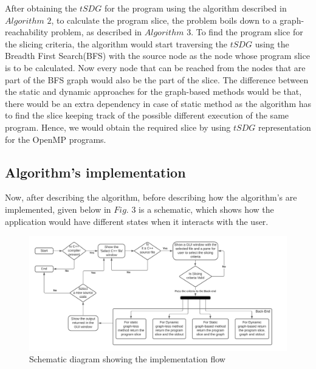 \documentclass[conference]{IEEEtran}
\begin{document}
 After obtaining the $tSDG$ for the program using the algorithm described in $Algorithm$ $2$, to calculate the program slice, the problem boils down to a graph-reachability problem, as described in $Algorithm$ $3$. To find the program slice for the slicing criteria, the algorithm would start traversing the $tSDG$ using the Breadth First Search(BFS) with the source node as the node whose program slice is to be calculated. Now every node that can be reached from the nodes that are part of the BFS graph would also be the part of the slice. The difference between the static and dynamic approaches for the graph-based methods would be that, there would be an extra dependency in case of static method as the algorithm has to find the slice keeping track of the possible different execution of the same program. Hence, we would obtain the required slice by using $tSDG$ representation for the OpenMP programs.   
\subsection{Algorithm's implementation}
Now, after describing the  algorithm, before describing how the algorithm's are implemented, given below in $Fig.$ $3$ is a schematic, which shows how the application would have different states when it interacts with the user.   
\begin{figure}[h]
    \centering
    \includegraphics[scale=0.35]{Schematic.jpeg}
    \caption{Schematic diagram showing the implementation flow}
    \label{fig:my_label}
\end{figure}
\end{document}
